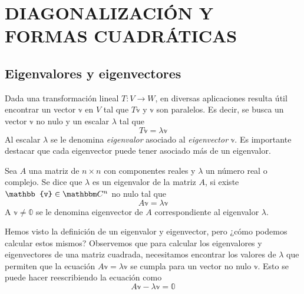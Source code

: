 \chapter{DIAGONALIZACIÓN Y FORMAS CUADRÁTICAS}\label{chapter:bilineal}
\printchaptertableofcontents

\section{Eigenvalores y eigenvectores}

Dada una transformación lineal $T: V \longrightarrow W$, en diversas aplicaciones  resulta útil encontrar un vector $\mathbb{v}$ en $V$ tal que $T\mathbb{v}$ y $\mathbb{v}$ son paralelos. Es decir, se busca un vector $\mathbb{v}$ no nulo y un escalar $\lambda$ tal que
$$T\mathbb{v} = \lambda \mathbb{v}$$
Al escalar $\lambda$ se le denomina \emph{eigenvalor} asociado al \emph{eigenvector} $\mathbb{v}$. Es importante destacar que cada eigenvector puede tener asociado más de un eigenvalor.

\begin{definition}\label{def:eigenvalor}
    Sea $A$ una matriz de $n \times n$ con componentes reales y $\lambda$ un número real o complejo. Se dice que $\lambda$ es un eigenvalor de la matriz $A$, si existe $\mathbb{v} \in \CC[n]$ no nulo tal que
    $$A\mathbb{v} = \lambda \mathbb{v}$$
    A $\mathbb{v} \neq \mathbb{0}$ se le denomina eigenvector de $A$ correspondiente al eigenvalor $\lambda$.
\end{definition}

Hemos visto la definición de un eigenvalor y eigenvector, pero ¿cómo podemos calcular estos mismos? Observemos que para calcular los eigenvalores y eigenvectores de una matriz cuadrada, necesitamos encontrar los valores de $\lambda$ que permiten que la ecuación $A \mathbb{v} = \lambda \mathbb{v}$ se cumpla para un vector no nulo $\mathbb{v}$. Esto se puede hacer reescribiendo la ecuación como
$$A \mathbb{v} - \lambda \mathbb{v} = \mathbb{0}$$


\newpage
{}

